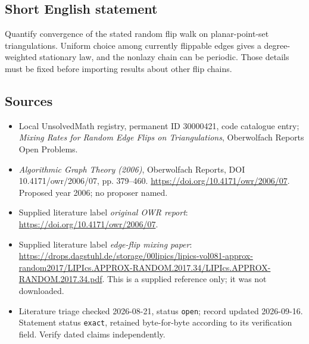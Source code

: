 \documentclass[11pt]{article}
\begin{document}
\subsection{Short English statement}
Quantify convergence of the stated random flip walk on planar-point-set triangulations. Uniform choice among currently flippable edges gives a degree-weighted stationary law, and the nonlazy chain can be periodic. Those details must be fixed before importing results about other flip chains.
\subsection{Sources}
\begin{itemize}\item Local UnsolvedMath registry, permanent ID 30000421, code catalogue entry; \emph{Mixing Rates for Random Edge Flips on Triangulations}, Oberwolfach Reports Open Problems.\item \emph{Algorithmic Graph Theory (2006)}, Oberwolfach Reports, DOI 10.4171/owr/2006/07, pp. 379--460. \url{https://doi.org/10.4171/owr/2006/07}. Proposed year 2006; no proposer named.\item Supplied literature label \emph{original OWR report}: \url{https://doi.org/10.4171/owr/2006/07}.\item Supplied literature label \emph{edge-flip mixing paper}: \url{https://drops.dagstuhl.de/storage/00lipics/lipics-vol081-approx-random2017/LIPIcs.APPROX-RANDOM.2017.34/LIPIcs.APPROX-RANDOM.2017.34.pdf}. This is a supplied reference only; it was not downloaded.\item Literature triage checked 2026-08-21, status \texttt{open}; record updated 2026-09-16. Statement status \texttt{exact}, retained byte-for-byte according to its verification field. Verify dated claims independently.\end{itemize}
\end{document}
